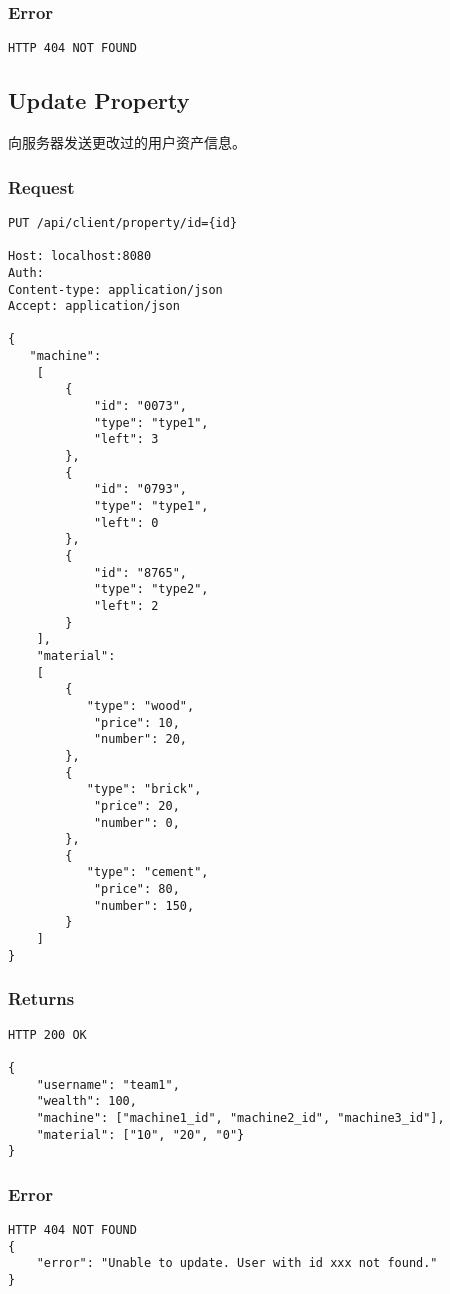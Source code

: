 \documentclass{article}
\begin{document}
\subsubsection*{Error}
\begin{lstlisting}
HTTP 404 NOT FOUND
\end{lstlisting}








\subsection{Update Property}
向服务器发送更改过的用户资产信息。
\subsubsection*{Request}
\begin{lstlisting}
PUT /api/client/property/id={id}

Host: localhost:8080
Auth:
Content-type: application/json
Accept: application/json

{
   "machine":
    [
        {
            "id": "0073",
            "type": "type1",
            "left": 3
        },
        {
            "id": "0793",
            "type": "type1",
            "left": 0
        },
        {
            "id": "8765",
            "type": "type2",
            "left": 2
        }
    ],
    "material":
    [
        {
       	   "type": "wood",
            "price": 10,
            "number": 20,
        },
        {
       	   "type": "brick",
            "price": 20,
            "number": 0,
        },
        {
       	   "type": "cement",
            "price": 80,
            "number": 150,
        }
    ]
}
\end{lstlisting}
\subsubsection*{Returns}
\begin{lstlisting}
HTTP 200 OK

{
    "username": "team1",
    "wealth": 100,
    "machine": ["machine1_id", "machine2_id", "machine3_id"],
    "material": ["10", "20", "0"}
}
\end{lstlisting}
\subsubsection*{Error}
\begin{lstlisting}
HTTP 404 NOT FOUND
{
    "error": "Unable to update. User with id xxx not found."
}
\end{lstlisting}
\end{document}
